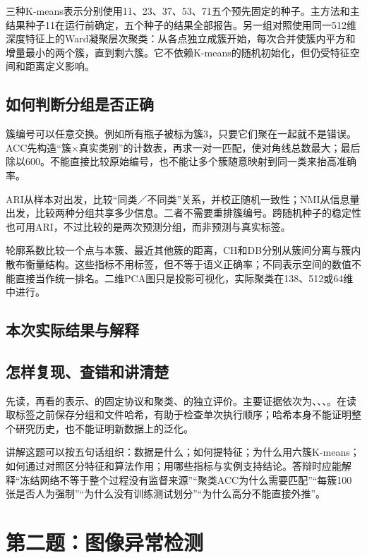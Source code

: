 \documentclass[UTF8,fontset=windows,11pt,a4paper]{ctexart}
\begin{document}
三种K-means表示分别使用11、23、37、53、71五个预先固定的种子。主方法和主结果种子11在运行前确定，五个种子的结果全部报告。另一组对照使用同一512维深度特征上的Ward凝聚层次聚类：从各点独立成簇开始，每次合并使簇内平方和增量最小的两个簇，直到剩六簇。它不依赖K-means的随机初始化，但仍受特征空间和距离定义影响。

\subsection{如何判断分组是否正确}
簇编号可以任意交换。例如所有瓶子被标为簇3，只要它们聚在一起就不是错误。ACC先构造“簇×真实类别”的计数表，再求一对一匹配，使对角线总数最大；最后除以600。不能直接比较原始编号，也不能让多个簇随意映射到同一类来抬高准确率。

ARI从样本对出发，比较“同类／不同类”关系，并校正随机一致性；NMI从信息量出发，比较两种分组共享多少信息。二者不需要重排簇编号。跨随机种子的稳定性也可用ARI，不过比较的是两次预测分组，而非预测与真实标签。

轮廓系数比较一个点与本簇、最近其他簇的距离，CH和DB分别从簇间分离与簇内散布衡量结构。这些指标不用标签，但不等于语义正确率；不同表示空间的数值不能直接当作统一排名。二维PCA图只是投影可视化，实际聚类在138、512或64维中进行。

\subsection{本次实际结果与解释}

\subsection{怎样复现、查错和讲清楚}
先读，再看的表示、的固定协议和聚类、的独立评价。主要证据依次为、、、。在读取标签之前保存分组和文件哈希，有助于检查单次执行顺序；哈希本身不能证明整个研究历史，也不能证明新数据上的泛化。

讲解这题可以按五句话组织：数据是什么；如何提特征；为什么用六簇K-means；如何通过对照区分特征和算法作用；用哪些指标与实例支持结论。答辩时应能解释“冻结网络不等于整个过程没有监督来源”“聚类ACC为什么需要匹配”“每簇100张是否人为强制”“为什么没有训练测试划分”“为什么高分不能直接外推”。
\section{第二题：图像异常检测}
\end{document}

